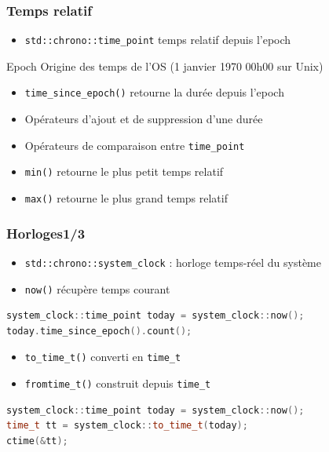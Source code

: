 \documentclass[C++.tex]{subfiles}
\begin{document}
\begin{frame}[fragile]
	\frametitle{Temps relatif}
	\begin{itemize}
		\item \lstinline|std::chrono::time_point| temps relatif depuis l'epoch
	\end{itemize}

	\begin{block}{Epoch}
		Origine des temps de l'OS (1 janvier 1970 00h00 sur Unix)
	\end{block}

	\begin{itemize}
		\item \lstinline|time_since_epoch()| retourne la durée depuis l'epoch
		\item Opérateurs d'ajout et de suppression d'une durée
		\item Opérateurs de comparaison entre \lstinline|time_point|
		\item \lstinline|min()| retourne le plus petit temps relatif
		\item \lstinline|max()| retourne le plus grand temps relatif
	\end{itemize}
\end{frame}

\begin{frame}[fragile]
	\frametitle{Horloges\titlehfill{}1/3}
	\begin{itemize}
		\item \lstinline|std::chrono::system_clock| : horloge temps-réel du système
		\item \lstinline|now()| récupère temps courant
	\end{itemize}

	\begin{lstlisting}[language=C++]
system_clock::time_point today = system_clock::now();
today.time_since_epoch().count();\end{lstlisting}

	\begin{itemize}
		\item \lstinline|to_time_t()| converti en \lstinline|time_t|
		\item \lstinline|fromtime_t()| construit depuis \lstinline|time_t|
	\end{itemize}

	\begin{lstlisting}[language=C++]
system_clock::time_point today = system_clock::now();
time_t tt = system_clock::to_time_t(today);
ctime(&tt);\end{lstlisting}
\end{frame}
\end{document}
